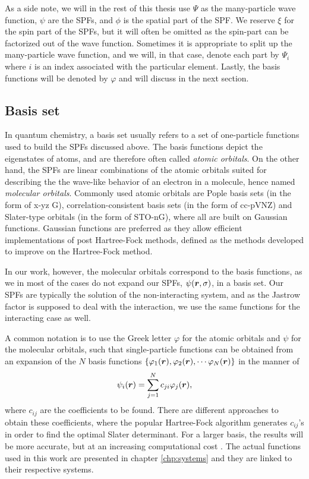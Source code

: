 As a side note, we will in the rest of this thesis use $\Psi$ as the many-particle wave function, $\psi$ are the SPFs, and $\phi$ is the spatial part of the SPF. We reserve $\xi$ for the spin part of the SPFs, but it will often be omitted as the spin-part can be factorized out of the wave function. Sometimes it is appropriate to split up the many-particle wave function, and we will, in that case, denote each part by $\Psi_i$ where $i$ is an index associated with the particular element. Lastly, the basis functions will be denoted by $\varphi$ and will discuss in the next section.

\subsection{Basis set} \label{sec:basisset}
In quantum chemistry, a basis set usually refers to a set of one-particle functions used to build the SPFs discussed above. The basis functions depict the eigenstates of atoms, and are therefore often called \textit{atomic orbitals}. On the other hand, the SPFs are linear combinations of the atomic orbitals suited for describing the the wave-like behavior of an electron in a molecule, hence named \textit{molecular orbitals}. Commonly used atomic orbitals are Pople basis sets \supercite{ditchfield_self-consistent_1971} (in the form of x-yz G), correlation-consistent basis sets \supercite{dunning_gaussian_1989} (in the form of cc-pVNZ) and Slater-type orbitals \supercite{slater_atomic_1930} (in the form of STO-nG), where all are built on Gaussian functions. Gaussian functions are preferred as they allow efficient implementations of post Hartree-Fock methods, defined as the methods developed to improve on the Hartree-Fock method.

In our work, however, the molecular orbitals correspond to the basis functions, as we in most of the cases do not expand our SPFs, $\psi(\boldsymbol{{r}},\sigma)$, in a basis set. Our SPFs are typically the solution of the non-interacting system, and as the Jastrow factor is supposed to deal with the interaction, we use the same functions for the interacting case as well.

A common notation is to use the Greek letter $\varphi$ for the atomic orbitals and $\psi$ for the molecular orbitals, such that single-particle functions can be obtained from an expansion of the $N$ basis functions $\{\varphi_1(\boldsymbol{{r}}),\varphi_2(\boldsymbol{{r}}),\cdots\varphi_N(\boldsymbol{{r}})\}$ in the manner of
\begin{equation}
\psi_i(\boldsymbol{{r}})=\sum_{j=1}^Nc_{ji}\varphi_j(\boldsymbol{{r}}),
\label{eq:expansion}
\end{equation}
where $c_{ij}$ are the coefficients to be found. There are different approaches to obtain these coefficients, where the popular Hartree-Fock algorithm generates $c_{ij}$'s in order to find the optimal Slater determinant. For a larger basis, the results will be more accurate, but at an increasing computational cost \supercite{daniel_crawford_introduction_2007}. The actual functions used in this work are presented in chapter \ref{chp:systems} and they are linked to their respective systems. 

